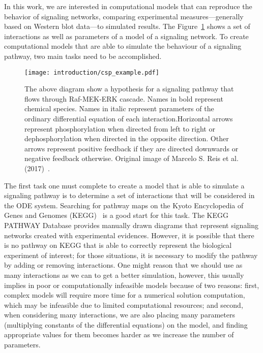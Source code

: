 In this work, we are interested in computational models that can 
reproduce the behavior of signaling networks, comparing experimental 
measures---generally based on Western blot data---to simulated results.
The Figure~\ref{fig:signal_pathway_example} shows a set of interactions
as well as parameters of a model of a signaling network. To create 
computational models that are able to simulate the behaviour of a 
signaling pathway, two main tasks need to be accomplished.

\begin{figure}[!ht]
\centering 
    \texttt{[image: introduction/csp\_example.pdf]}
\caption{The above diagram show a hypothesis for a signaling pathway 
    that flows through Raf-MEK-ERK cascade. Names in bold represent 
    chemical species. Names in italic represent parameters of the 
    ordinary differential equation of each interaction.Horizontal arrows
    represent phosphorylation when directed from left to right or 
    dephosphorylation when directed in the opposite direction. Other 
    arrows represent positive feedback if they are directed downwards or 
    negative feedback otherwise. Original image of Marcelo S. Reis et
    al. (2017)~\cite{Reis2017}.}
\label{fig:signal_pathway_example}
\end{figure}

The first task one must complete to create a model that is able to 
simulate a signaling pathway is to determine a set 
of interactions that will be considered in the ODE system. Searching for 
pathway maps on the Kyoto Encyclopedia of Genes and Genomes 
(KEGG)~\cite{Kanehisa2000kegg} is a good start for this task. The KEGG 
PATHWAY Database provides manually drawn diagrams that represent 
signaling networks created with experimental evidences. However, it is 
possible that there is no pathway on KEGG that is able to correctly 
represent the biological experiment of interest; for those situations, 
it is necessary to modify the pathway by adding or removing 
interactions. One might reason that we should use as many interactions 
as we can to get a better simulation, however, this usually implies in 
poor or computationally infeasible models because of two reasons: first, 
complex models will require more time for a numerical solution 
computation, which may be infeasible due to limited computational 
resources; and second, when considering many interactions, we are also 
placing many parameters (multiplying constants of the differential 
equations) on the model, and finding appropriate values for them becomes 
harder as we increase the number of parameters.

